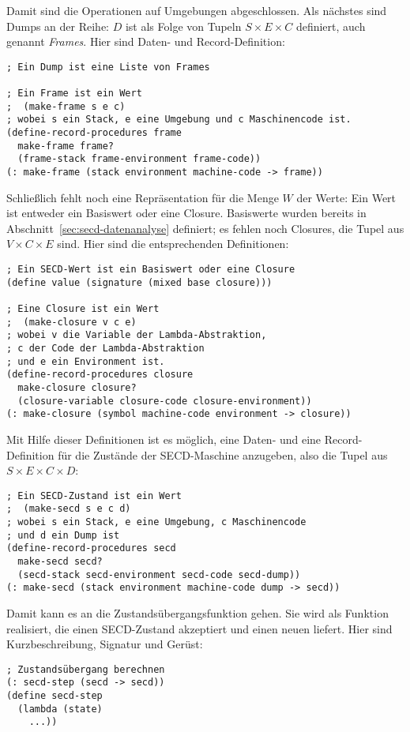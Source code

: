 %
Damit sind die Operationen auf Umgebungen abgeschlossen.  Als nächstes
sind Dumps an der Reihe: $D$ ist als Folge von Tupeln $S\times E\times
C$ definiert, auch genannt \textit{Frames}.  Hier sind
Daten- und Record-Definition:
%
\begin{verbatim}
; Ein Dump ist eine Liste von Frames

; Ein Frame ist ein Wert
;  (make-frame s e c)
; wobei s ein Stack, e eine Umgebung und c Maschinencode ist.
(define-record-procedures frame
  make-frame frame?
  (frame-stack frame-environment frame-code))
(: make-frame (stack environment machine-code -> frame))
\end{verbatim}
%
Schließlich fehlt noch eine Repräsentation für die Menge $W$ der
Werte:  Ein Wert ist entweder ein Basiswert oder eine Closure.
Basiswerte wurden bereits in Abschnitt~\ref{sec:secd-datenanalyse}
definiert; es fehlen noch Closures, die Tupel aus $V\times C\times E$
sind.  Hier sind die entsprechenden Definitionen:
%
\begin{verbatim}
; Ein SECD-Wert ist ein Basiswert oder eine Closure
(define value (signature (mixed base closure)))

; Eine Closure ist ein Wert
;  (make-closure v c e)
; wobei v die Variable der Lambda-Abstraktion,
; c der Code der Lambda-Abstraktion
; und e ein Environment ist.
(define-record-procedures closure
  make-closure closure?
  (closure-variable closure-code closure-environment))
(: make-closure (symbol machine-code environment -> closure))
\end{verbatim}
%
Mit Hilfe dieser Definitionen ist es möglich, eine Daten- und eine
Record-Definition für die Zustände der SECD-Maschine anzugeben, also
die Tupel aus $S\times E\times C\times D$:
%
\begin{verbatim}
; Ein SECD-Zustand ist ein Wert
;  (make-secd s e c d)
; wobei s ein Stack, e eine Umgebung, c Maschinencode
; und d ein Dump ist
(define-record-procedures secd
  make-secd secd?
  (secd-stack secd-environment secd-code secd-dump))
(: make-secd (stack environment machine-code dump -> secd))
\end{verbatim}
%
Damit kann es an die Zustandsübergangsfunktion gehen.   Sie wird als
Funktion realisiert, die einen SECD-Zustand akzeptiert und einen neuen
liefert.  Hier sind Kurzbeschreibung, Signatur und Gerüst:
%
\begin{verbatim}
; Zustandsübergang berechnen
(: secd-step (secd -> secd))
(define secd-step
  (lambda (state)
    ...))
\end{verbatim}
